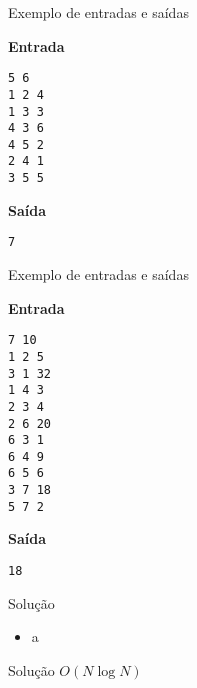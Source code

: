 \begin{frame}[fragile]{Exemplo de entradas e saídas}

\begin{minipage}[t]{0.45\textwidth}
\textbf{Entrada}
\begin{verbatim}
5 6
1 2 4
1 3 3
4 3 6
4 5 2
2 4 1
3 5 5
\end{verbatim}
\end{minipage}
\begin{minipage}[t]{0.5\textwidth}
\textbf{Saída}
\begin{verbatim}
7
\end{verbatim}
\end{minipage}
\end{frame}

\begin{frame}[fragile]{Exemplo de entradas e saídas}

\begin{minipage}[t]{0.45\textwidth}
\textbf{Entrada}
\begin{verbatim}
7 10
1 2 5
3 1 32
1 4 3
2 3 4
2 6 20
6 3 1
6 4 9
6 5 6
3 7 18
5 7 2
\end{verbatim}
\end{minipage}
\begin{minipage}[t]{0.5\textwidth}
\textbf{Saída}
\begin{verbatim}
18
\end{verbatim}
\end{minipage}
\end{frame}


\begin{frame}[fragile]{Solução}

    \begin{itemize}
        \item a
    \end{itemize}

\end{frame}

\begin{frame}[fragile]{Solução $O(N\log N)$}
\end{frame}
